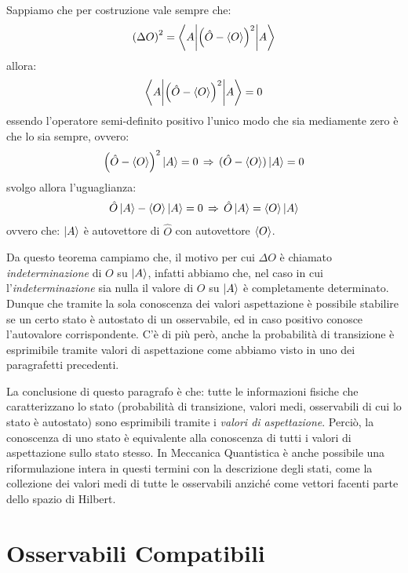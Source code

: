 \begin{itemize}
\begin{myprf}
\begin{itemize}[label={},  leftmargin=5pt]
		Sappiamo che per costruzione vale sempre che:		
	\begin{align*}
		\qty(\Delta O)^2 = \mel**{A}{ \qty(\hat{O} - \langle O \rangle)^2 }{A}
	\end{align*}
		allora:
	\begin{align*}
		\mel**{A}{ \qty(\hat{O} - \langle O \rangle)^2 }{A} = 0
	\end{align*}
		essendo l'operatore semi-definito positivo l'unico modo che sia mediamente zero è che lo sia sempre, ovvero:
	\begin{align*}
		\qty(\hat{O} - \langle O \rangle)^2\ket{A} = 0  \, \Rightarrow \, (\hat{O} - \langle O \rangle) \ket{A} = 0
	\end{align*}
		svolgo allora l'uguaglianza:
	\begin{align*}
		\hat{O}\ket{A} - \langle O \rangle\ket{A} = 0 \, \Rightarrow \, \hat{O}\ket{A} = \langle O \rangle\ket{A}
	\end{align*}
		ovvero che: $\ket{A}$ è autovettore di $\hat{O}$ con autovettore $\langle O \rangle$.
\end{itemize}
\end{myprf}
	
	Da questo teorema campiamo che, il motivo per cui $\Delta O$ è chiamato \textit{indeterminazione} di $O$ su $\ket{A}$, infatti abbiamo che, nel caso in cui l'\textit{indeterminazione} sia nulla il valore di $O$ su $\ket{A}$ è completamente determinato. Dunque che tramite la sola conoscenza dei valori aspettazione è possibile stabilire se un certo stato è autostato di un osservabile, ed in caso positivo conosce l'autovalore corrispondente. C'è di più però, anche la probabilità di transizione è esprimibile tramite valori di aspettazione come abbiamo visto in uno dei paragrafetti precedenti.	

\end{itemize}

	La conclusione di questo paragrafo è che: tutte le informazioni fisiche che caratterizzano lo stato (probabilità di transizione, valori medi, osservabili di cui lo stato è autostato) sono esprimibili tramite i \textit{valori di aspettazione}. Perciò, la conoscenza di uno stato è equivalente alla conoscenza di tutti i valori di aspettazione sullo stato stesso. In Meccanica Quantistica è anche possibile una riformulazione intera in questi termini con la descrizione degli stati, come la collezione dei valori medi di tutte le osservabili anziché come vettori facenti parte dello spazio di Hilbert.

\section{Osservabili Compatibili}

